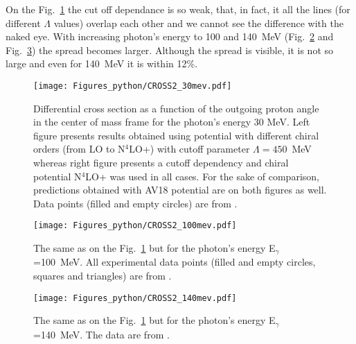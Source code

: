     On the Fig.~\ref{CROSS_30} the cut off dependance is so weak,
    that, in fact, it all the lines (for different $\Lambda$ values)
    overlap each other and we cannot see the difference with the naked eye.
    With increasing photon's energy to 100 and 140~MeV (Fig.~\ref{CROSS_100}
    and Fig.~\ref{CROSS_140}) the spread becomes larger. 
    Although the spread is visible, it is not so large and even for 140~MeV
    it is within 12\%. 
    

    \begin{figure}[h]
        \begin{center}
        \texttt{[image: Figures\_python/CROSS2\_30mev.pdf]}
        \end{center}
        \caption{Differential cross section as a function of the outgoing proton angle in the center of mass frame 
        for the photon's energy 30 MeV. Left figure presents results obtained using potential
        with different chiral orders (from LO to N$^4$LO+) with cutoff parameter $\Lambda=450$~MeV
        whereas right figure presents a cutoff dependency and chiral potential N$^4$LO+ was used in all cases.
        For the sake of comparison, predictions obtained with AV18 potential are on both figures as well.
        Data points (filled and empty circles) are from \cite{Ying_Experiment_Deut}.}
        \label{CROSS_30}
    \end{figure}
        

    \begin{figure}[h]
        \begin{center}
        \texttt{[image: Figures\_python/CROSS2\_100mev.pdf]}
        \end{center}
        \caption{The same as on the Fig.~\ref{CROSS_30} but for the photon's energy E$_\gamma$=100~MeV.
        All experimental data points (filled and empty circles, squares and triangles) are from \cite{Ying_Experiment_Deut}.}
        \label{CROSS_100}
    \end{figure}

    \begin{figure}[h]
        \begin{center}
        \texttt{[image: Figures\_python/CROSS2\_140mev.pdf]}
        \end{center}
        \caption{The same as on the Fig.~\ref{CROSS_30} but for the photon's energy E$_\gamma$=140~MeV.
        The data are from \cite{DeSanctis_Experiment_Deut}.}
        \label{CROSS_140}
    \end{figure}
        
